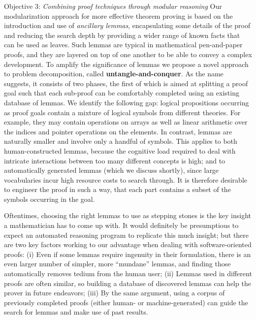 \begin{paragraph}{Objective 3: {\it Combining proof techniques through modular reasoning}}
Our modularization approach for more effective theorem proving is based on the introduction and use of \emph{ancillary lemmas}, encapsulating some details of the proof and reducing the search depth by providing a wider range of known facts that can be used as leaves.
Such lemmas are typical in mathematical pen-and-paper proofs, and they are layered on top of one another to be able to convey a complex development.
To amplify the significance of lemmas we propose a novel approach to problem decomposition, called \textbf{untangle-and-conquer}.
As the name suggests, it consists of two phases, the first of which is aimed at splitting a proof goal such that each sub-proof can be comfortably completed using an existing database of lemmas.
We identify the following gap: logical propositions occurring as proof goals contain a mixture of logical symbols from different theories.
For example, they may contain operations on arrays as well as linear arithmetic over the indices and pointer operations on the elements.
In contrast, lemmas are naturally smaller and involve only a handful of symbols.
This applies to both human-constructed lemmas, because the cognitive load required to deal with intricate interactions between too many different concepts is high;
and to automatically generated lemmas (which we discuss shortly), since large vocabularies incur high resource costs to search through.
It is therefore desirable to engineer the proof in such a way, that each part contains a subset of the symbols occurring in the goal.


Oftentimes, choosing the right lemmas to use as stepping stones is the key insight a mathematician has to come up with.
It would definitely be presumptious to expect an automated reasoning program to replicate this much insight; but there are two key factors working to our advantage when dealing with software-oriented proofs:
(i) Even if some lemmas require ingenuity in their formulation, there is an even larger number of simpler, more ``mundane'' lemmas, and finding those automatically removes tedium from the human user;
(ii) Lemmas used in different proofs are often similar, 
so building a database of discovered lemmas can help the prover in future endeavors;
(iii) By the same argument, using a corpus of previously completed proofs (either human- or machine-generated) can guide the search for lemmas and make use of past results.


\end{paragraph}

